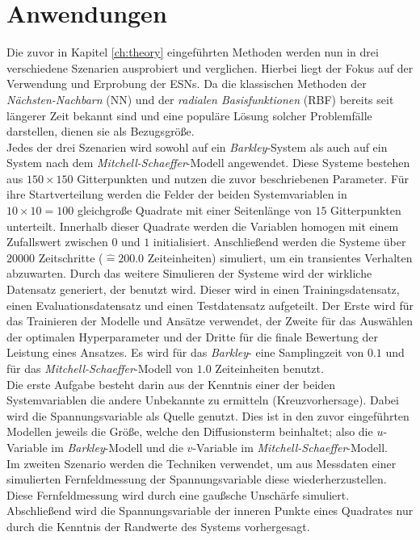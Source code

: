 \chapter{Anwendungen}
\label{ch:experiments}
Die zuvor in Kapitel \ref{ch:theory} eingeführten Methoden werden nun in drei verschiedene Szenarien ausprobiert und verglichen. Hierbei liegt der Fokus auf der Verwendung und Erprobung der \textsc{ESN}s. Da die klassischen Methoden der \textit{Nächsten-Nachbarn} (\textsc{NN}) und der \textit{radialen Basisfunktionen} (\textsc{RBF}) bereits seit längerer Zeit bekannt sind und eine populäre Lösung solcher Problemfälle darstellen, dienen sie als Bezugsgröße.\\

Jedes der drei Szenarien wird sowohl auf ein \textit{Barkley}-System als auch auf ein System nach dem \textit{Mitchell-Schaeffer}-Modell angewendet. Diese Systeme bestehen aus $150 \times 150$ Gitterpunkten und nutzen die zuvor beschriebenen Parameter. Für ihre Startverteilung werden die Felder der beiden Systemvariablen in $10 \times 10 = 100$ gleichgroße Quadrate mit einer Seitenlänge von $15$ Gitterpunkten unterteilt. Innerhalb dieser Quadrate werden die Variablen homogen mit einem Zufallswert zwischen $0$ und $1$ initialisiert. Anschließend werden die Systeme über $20000$ Zeitschritte ($\widehat{=} 200.0$ Zeiteinheiten) simuliert, um ein transientes Verhalten abzuwarten. Durch das weitere Simulieren der Systeme wird der wirkliche Datensatz generiert, der benutzt wird. Dieser wird in einen Trainingsdatensatz, einen Evaluationsdatensatz und einen Testdatensatz aufgeteilt. Der Erste wird für das Trainieren der Modelle und Ansätze verwendet, der Zweite für das Auswählen der optimalen Hyperparameter und der Dritte für die finale Bewertung der Leistung eines Ansatzes. Es wird für das \textit{Barkley}- eine Samplingzeit von $0.1$ und für das \textit{Mitchell-Schaeffer}-Modell von $1.0$ Zeiteinheiten benutzt.\\
 
Die erste Aufgabe besteht darin aus der Kenntnis einer der beiden Systemvariablen die andere Unbekannte zu ermitteln (Kreuzvorhersage). Dabei wird die Spannungsvariable als Quelle genutzt. Dies ist in den zuvor eingeführten Modellen jeweils die Größe, welche den Diffusionsterm beinhaltet; also die $u$-Variable im \textit{Barkley}-Modell und die $v$-Variable im \textit{Mitchell-Schaeffer}-Modell.\\
Im zweiten Szenario werden die Techniken verwendet, um aus Messdaten einer simulierten Fernfeldmessung der Spannungsvariable  diese wiederherzustellen. Diese Fernfeldmessung wird durch eine gaußsche Unschärfe simuliert.\\
Abschließend wird die Spannungsvariable der inneren Punkte eines Quadrates nur durch die Kenntnis der Randwerte des Systems vorhergesagt.\\

